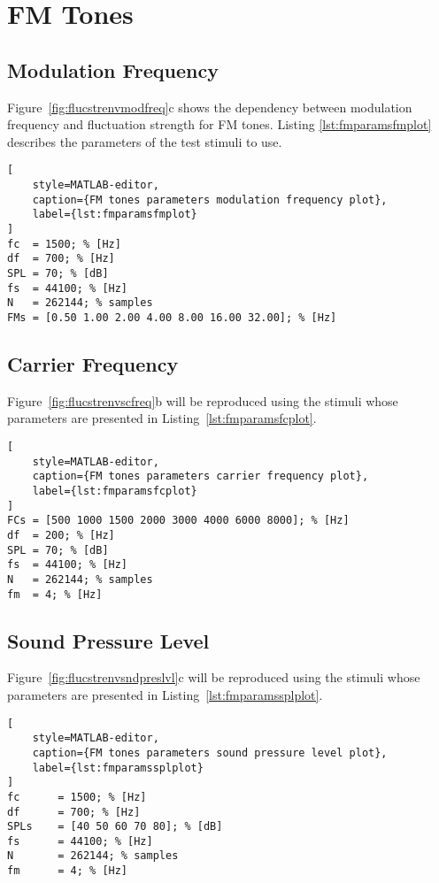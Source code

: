 \documentclass[a4paper]{article}
\begin{document}
\section{FM Tones}

\subsection{Modulation Frequency}

Figure~\ref{fig:flucstrenvmodfreq}c shows the dependency between modulation
frequency and fluctuation strength for FM tones. Listing
\ref{lst:fmparamsfmplot} describes the parameters of the test stimuli to use.

\begin{lstlisting}[
    style=MATLAB-editor,
    caption={FM tones parameters modulation frequency plot},
    label={lst:fmparamsfmplot}
]
fc  = 1500; % [Hz]
df  = 700; % [Hz]
SPL = 70; % [dB]
fs  = 44100; % [Hz]
N   = 262144; % samples
FMs = [0.50 1.00 2.00 4.00 8.00 16.00 32.00]; % [Hz]
\end{lstlisting}

\subsection{Carrier Frequency}

Figure~\ref{fig:flucstrenvscfreq}b will be reproduced using the stimuli whose
parameters are presented in Listing~\ref{lst:fmparamsfcplot}.

\begin{lstlisting}[
    style=MATLAB-editor,
    caption={FM tones parameters carrier frequency plot},
    label={lst:fmparamsfcplot}
]
FCs = [500 1000 1500 2000 3000 4000 6000 8000]; % [Hz]
df  = 200; % [Hz]
SPL = 70; % [dB]
fs  = 44100; % [Hz]
N   = 262144; % samples
fm  = 4; % [Hz]
\end{lstlisting}

\subsection{Sound Pressure Level}

Figure~\ref{fig:flucstrenvsndpreslvl}c will be reproduced using the stimuli
whose parameters are presented in Listing~\ref{lst:fmparamssplplot}.

\begin{lstlisting}[
    style=MATLAB-editor,
    caption={FM tones parameters sound pressure level plot},
    label={lst:fmparamssplplot}
]
fc      = 1500; % [Hz]
df      = 700; % [Hz]
SPLs    = [40 50 60 70 80]; % [dB]
fs      = 44100; % [Hz]
N       = 262144; % samples
fm      = 4; % [Hz]
\end{lstlisting}
\end{document}
